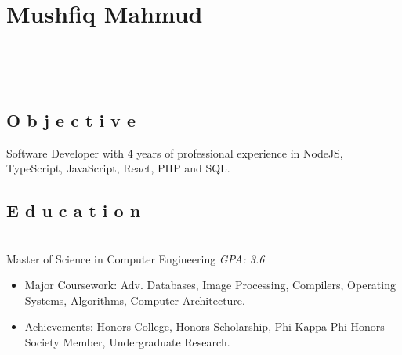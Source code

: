 \documentclass{resume}
\begin{document}

\section{Mushfiq Mahmud}

\begin{center}
	 \hspace{2mm}
	\address{Tampa, FL} \hspace{2mm}
	 \\
	\vspace{1mm}

	 \hspace{1mm}
	 \hspace{1mm}
	 \\
	\vspace{-3mm}
\end{center}


\subsection{O b j e c t i v e}
\small Software Developer with 4 years of professional experience in NodeJS, TypeScript, JavaScript, React, PHP and SQL.


\subsection{E d u c a t i o n}
 \\
Master of Science in Computer Engineering \hfill \emph{GPA: 3.6}

\begin{itemize}
\item \small Major Coursework: Adv. Databases, Image Processing, Compilers, Operating Systems, Algorithms, Computer Architecture.
\item \small Achievements: Honors College, Honors Scholarship, Phi Kappa Phi Honors Society Member, Undergraduate Research.
\end{itemize}

\end{document}
